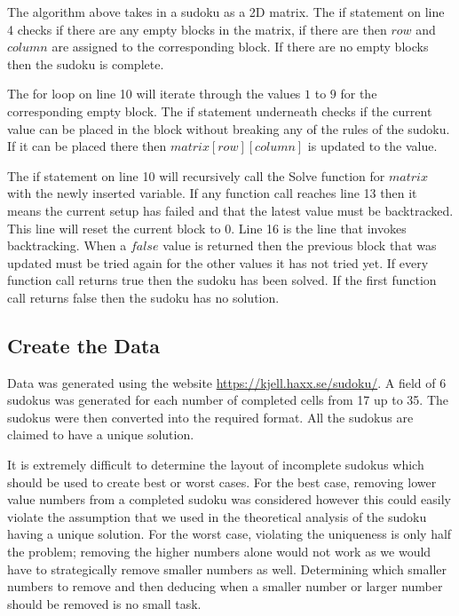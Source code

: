 \documentclass{article}
\begin{document}
The algorithm above takes in a sudoku as a 2D matrix. The if statement on line 4 checks if there are any empty blocks in the matrix, if there are then $row$ and $column$ are assigned to the corresponding block. If there are no empty blocks then the sudoku is complete. 

The for loop on line 10 will iterate through the values $1$ to $9$ for the corresponding empty block. The if statement underneath checks if the current value can be placed in the block without breaking any of the rules of the sudoku. If it can be placed there then $matrix[row][column]$ is updated to the value.

The if statement on line 10 will recursively call the Solve function for $matrix$ with the newly inserted variable.
If any function call reaches line 13 then it means the current setup has failed and that the latest value must be backtracked. This line will reset the current block to 0. Line 16 is the line that invokes backtracking. When a $false$ value is returned then the previous block that was updated must be tried again for the other values it has not tried yet. If every function call returns true then the sudoku has been solved. If the first function call returns false then the sudoku has no solution.

\newpage

\subsection{Create the Data}
Data was generated using the website \url{https://kjell.haxx.se/sudoku/}. A field of 6 sudokus was generated for each number of completed cells from 17 up to 35. The sudokus were then converted into the required format. All the sudokus are claimed to have a unique solution.

It is extremely difficult to determine the layout of incomplete sudokus which should be used to create best or worst cases. For the best case, removing lower value numbers from a completed sudoku was considered however this could easily violate the assumption that we used in the theoretical analysis of the sudoku having a unique solution. For the worst case, violating the uniqueness is only half the problem; removing the higher numbers alone would not work as we would have to strategically remove smaller numbers as well. Determining which smaller numbers to remove and then deducing when a smaller number or larger number should be removed is no small task.
\end{document}
